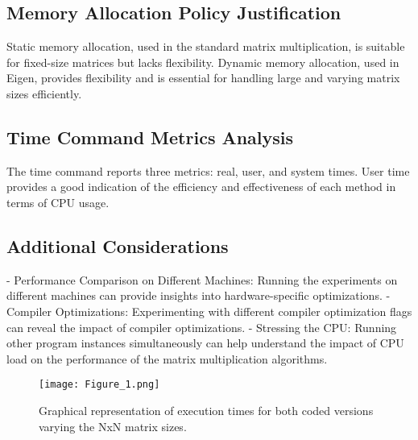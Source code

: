 \documentclass{article}
\begin{document}
\subsection{Memory Allocation Policy Justification}
Static memory allocation, used in the standard matrix multiplication, is suitable for fixed-size matrices but lacks flexibility. Dynamic memory allocation, used in Eigen, provides flexibility and is essential for handling large and varying matrix sizes efficiently.

\subsection{Time Command Metrics Analysis}
The time command reports three metrics: real, user, and system times. User time provides a good indication of the efficiency and effectiveness of each method in terms of CPU usage.

\subsection{Additional Considerations}
- Performance Comparison on Different Machines: Running the experiments on different machines can provide insights into hardware-specific optimizations.
- Compiler Optimizations: Experimenting with different compiler optimization flags can reveal the impact of compiler optimizations.
- Stressing the CPU: Running other program instances simultaneously can help understand the impact of CPU load on the performance of the matrix multiplication algorithms.

\begin{figure}[h] 
    \centering 
    \texttt{[image: Figure\_1.png]} 
    \caption{Graphical representation of execution times for both coded versions varying the NxN matrix sizes.}
    \label{fig:mi_imagen} 
\end{figure}
\end{document}
